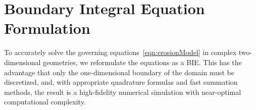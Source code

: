 \documentclass{jfm}
\begin{document}
\section{Boundary Integral Equation Formulation}
\label{sec:DLP}
To accurately solve the governing equations~\eqref{eqn:erosionModel} in
complex two-dimensional geometries, we reformulate the equations as a
BIE.  This has the advantage that only the one-dimensional boundary of
the domain must be discretized, and, with appropriate quadrature
formulas and fast summation methods, the result is a high-fidelity
numerical simulation with near-optimal computational complexity.

\end{document}
